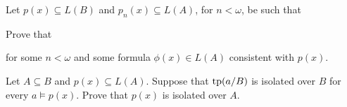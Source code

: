 \begin{exercise}\label{ex_Baire}
Let $p(x)\subseteq L(B)$ and $p_n(x)\subseteq L(A)$, for $n<\omega$, be such that


Prove that 


for some $n<\omega$ and some formula $\phi(x)\in L(A)$ consistent with $p(x)$.
\end{exercise}

\begin{comment}
\begin{exercise}
Let $M$ be a second countable topological space (i.e.\@ the topology has a countable base).
We say that $A\subseteq M$ is meager if it is the countable union of nowhere dense sets.

Use Lemma~\ref{lem_kuratowskiUlam} to prove the Kuratowski-Ulam Theorem, i.e.\@ that for $A\subseteq M^2$ the following are equivalent
\begin{itemize}
\item[1.] $A$ is meager in $M^2$  with the product topology
\item[2.] $\Big\{x\in M : A\cap \{x\}{\times}M \ \textrm{is not meager}\Big\}$ is meager in $M$.
\end{itemize}
Hint: Use the base of the topology as predicates of a first-order language.
\end{exercise}
\end{comment}

\begin{exercise} 
  Let $A\subseteq B$ and $p(x)\subseteq L(A)$. 
  Suppose that ${\rm tp}(a/B)$ is isolated over $B$ for every $a\models p(x)$.
  Prove that $p(x)$ is isolated over $A$.
  
  
  
  
  
  
  
  
  
  \end{exercise}


